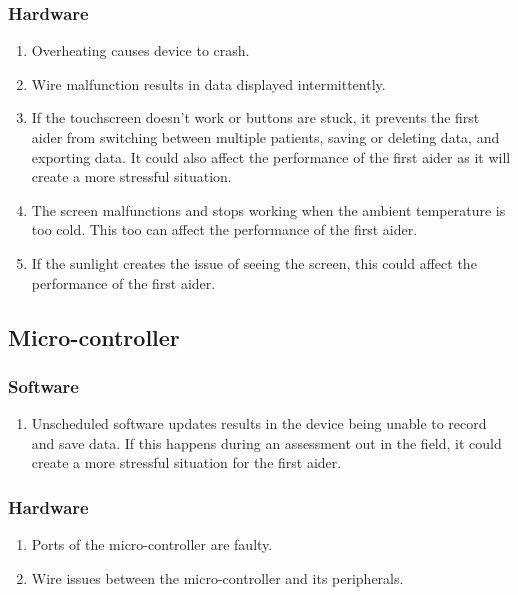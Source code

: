 \documentclass{article}
\begin{document}
        \subsubsection{Hardware}
            \begin{enumerate}[label = (\alph*)]
                \item Overheating causes device to crash.
                \item Wire malfunction results in data displayed intermittently.
                \item If the touchscreen doesn't work or buttons are stuck, it prevents the first aider from switching between multiple patients, saving or deleting data, and exporting data. It could also affect the performance of the first aider as it will create a more stressful situation. 
                \item The screen malfunctions and stops working when the ambient temperature is too cold.  This too can affect the performance of the first aider.
                \item If the sunlight creates the issue of seeing the screen, this could affect the performance of the first aider. 
            \end{enumerate}
            
    \subsection{Micro-controller}
        \subsubsection{Software}
            \begin{enumerate}[label = (\alph*)]
                \item Unscheduled software updates results in the device being unable to record and save data. If this happens during an assessment out in the field, it could create a more stressful situation for the first aider.
            \end{enumerate}
        \subsubsection{Hardware}
            \begin{enumerate}[label = (\alph*)]
                \item  Ports of the micro-controller are faulty.
                \item  Wire issues between the micro-controller and its peripherals. 
            \end{enumerate}
\end{document}
